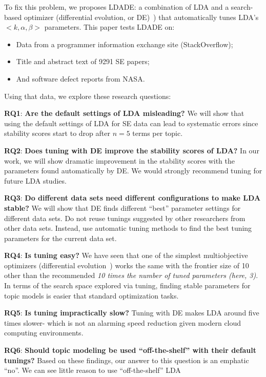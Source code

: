 \documentclass[10pt,conference]{IEEEtran}
\newcommand{\bi}{\begin{itemize}}
\newcommand{\ei}{\end{itemize}}
\theoremstyle{break}
\begin{document}
To fix this problem,
we proposes LDADE: a  combination of LDA and a search-based optimizer (differential evolution, or DE)~\cite{storn1997differential})
that automatically tunes LDA's \mbox{$<k,\alpha,\beta>$} parameters. This paper tests LDADE on:
\bi
\item Data from a programmer information exchange site (StackOverflow);
  \item Title and abstract text of
    9291 SE papers;
  \item And software defect reports from NASA.
    \ei
    Using that data, we explore these research questions:  
\begin{compactitem}
\item \textbf{RQ1}: \textbf{Are the default settings of LDA misleading?} We will show that using the default settings of LDA for SE data can lead to systematic errors since stability scores start to drop after $n=5$ terms per topic.
    \item \textbf{RQ2}: \textbf{Does tuning with DE improve the stability scores of LDA?} In our work, we will show dramatic improvement in the stability scores with the parameters found automatically by DE. We would strongly recommend tuning for future LDA studies.
    \item \textbf{RQ3}: \textbf{Do different data sets
      need different configurations to make LDA stable?} We will show that DE finds different ``best'' parameter settings for different data sets. Do not reuse  tunings  suggested  by  other  researchers  from other  data  sets.  Instead,  use  automatic  tuning  methods  to find the best tuning parameters for the current data set.
    \item \textbf{RQ4}: \textbf{Is tuning easy?} We have seen that one of the simplest multiobjective optimizers (differential evolution~\cite{storn1997differential}) works the same with the frontier size of 10 other than the recommended {\em10 times the number of tuned parameters (here, 3)}. In  terms  of  the  search  space  explored  via  tuning,  finding stable  parameters  for  topic  models  is  easier  that  standard optimization tasks.
    \item \textbf{RQ5}: \textbf{Is tuning impractically slow?}
      Tuning with DE makes LDA around five times slower- which is not an alarming
      speed reduction given modern cloud computing environments.
    \item \textbf{RQ6}: \textbf{Should topic modeling be used “off-the-shelf” with their default tunings?}
      Based on these findings, our answer to this question is an emphatic ``no''. We can see little reason to use “off-the-shelf” LDA
\end{compactitem}
\end{document}
